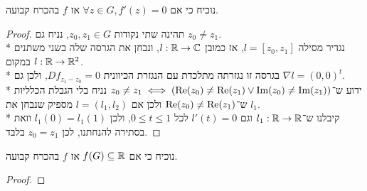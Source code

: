 \Subquestion{}
נוכיח כי אם $\forall z \in G, f'(z) = 0$ אז $f$ בהכרח קבועה.
\begin{proof}
	תהינה שתי נקודות $z_0, z_1 \in G$, נניח גם $z_0 \ne z_1$. \\*
	נגדיר מסילה $l = [z_0, z_1]$, אז כמובן $l : \mathbb{R} \to \mathbb{C}$, ונבחן את הגרסה שלה בשני משתנים $l : \mathbb{R} \to \mathbb{R}^2$ במקום. \\*
	בגרסה זו נגזרתה מתלכדת עם הנגזרת הכיוונית $Df_{z_1 - z_0} = 0$, ולכן גם $\nabla l = {(0, 0)}^t$. \\*
	ידוע ש־$z_0 \ne z_1 \iff (\operatorname{Re}(z_0) \ne \operatorname{Re}(z_1) \lor \operatorname{Im}(z_0) \ne \operatorname{Im}(z_1))$ נניח בלי הגבלת הכלליות ש־$\operatorname{Re}(z_0) \ne \operatorname{Re}(z_1)$ ולכן אם $l = (l_1, l_2)$ מספיק שנבחן את $l_1$. \\*
	קיבלנו ש־$l_1 : \mathbb{R} \to \mathbb{R}$ וגם $l'(t) = 0$ לכל $0 \le t \le 1$, ולכן $l_1(0) = l_1(1)$ וזאת בסתירה להנחתנו, לכן $z_0 = z_1$ בלבד.
\end{proof}

\Subquestion{}
נוכיח כי אם $f(G) \subseteq \mathbb{R}$ אז $f$ בהכרח קבועה.
\begin{proof}
\end{proof}


